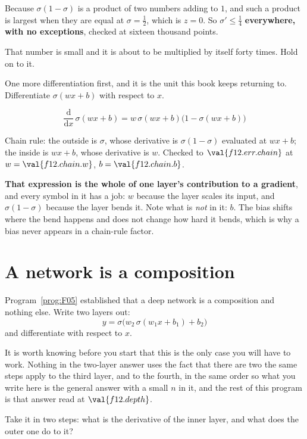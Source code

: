 \begin{fr}
Because $\sigma(1-\sigma)$ is a product of two numbers adding to $1$, and such
a product is largest when they are equal \dash{} at $\sigma = \frac{1}{2}$,
which is $z = 0$. So $\sigma' \le \frac{1}{4}$ \textbf{everywhere, with no
exceptions}, checked at sixteen thousand points.

That number is small and it is about to be multiplied by itself forty times.
Hold on to it.

One more differentiation first, and it is the unit this book keeps returning
to. Differentiate $\sigma(wx + b)$ with respect to $x$.
\nextframe
\end{fr}

\begin{fr}
\begin{ansblock}
\[ \frac{\mathrm{d}}{\mathrm{d}x}\,\sigma(wx+b)
   = w\,\sigma(wx+b)\bigl(1 - \sigma(wx+b)\bigr) \]
\end{ansblock}

Chain rule: the outside is $\sigma$, whose derivative is
$\sigma(1-\sigma)$ evaluated at $wx+b$; the inside is $wx+b$, whose derivative
is $w$. Checked to $\val{f12.err.chain}$ at
$w = \val{f12.chain.w}$, $b = \val{f12.chain.b}$.

\textbf{That expression is the whole of one layer's contribution to a
gradient}, and every symbol in it has a job: $w$ because the layer scales its
input, and $\sigma(1-\sigma)$ because the layer bends it. Note what is
\emph{not} in it: $b$. The bias shifts where the bend happens and does not
change how hard it bends, which is why a bias never appears in a chain-rule
factor.
\end{fr}

\section{A network is a composition}
\label{sec:F12-network}

\begin{fr}
Program~\ref{prog:F05} established that a deep network is a composition and
nothing else. Write two layers out:
\[ y = \sigma\bigl(w_2\,\sigma(w_1 x + b_1) + b_2\bigr) \]
and differentiate with respect to $x$.

It is worth knowing before you start that this is the only case you will have
to work. Nothing in the two-layer answer uses the fact that there are two
\dash{} the same steps apply to the third layer, and to the fourth, in the same
order \dash{} so what you write here is the general answer with a small $n$ in
it, and the rest of this program is that answer read at $\val{f12.depth}$.

Take it in two steps: what is the derivative of the inner layer, and what does
the outer one do to it?
\dotline
\nextframe
\end{fr}


